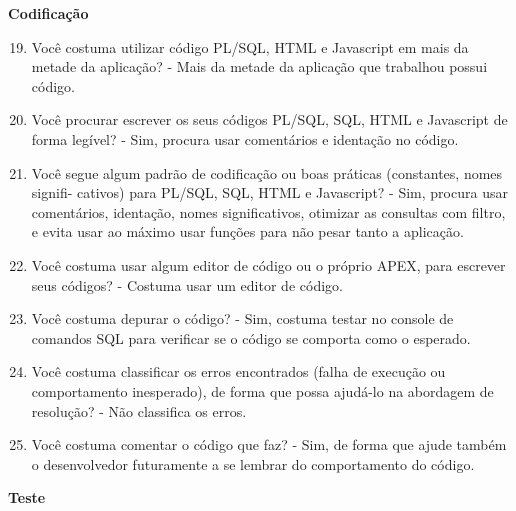 \begin{apendicesenv}
\textbf{Codificação}

\begin{enumerate}
	\setcounter{enumi}{18}
	\item Você costuma utilizar código PL/SQL, HTML e Javascript em mais da metade da
	aplicação?\newline
	- Mais da metade da aplicação que trabalhou possui código.
	\item Você procurar escrever os seus códigos PL/SQL, SQL, HTML e Javascript de forma
	legível?\newline
	- Sim, procura usar comentários e identação no código.
	\item Você segue algum padrão de codificação ou boas práticas (constantes, nomes signifi-
	cativos) para PL/SQL, SQL, HTML e Javascript?\newline
	- Sim, procura usar comentários, identação, nomes significativos, otimizar as consultas com filtro, e evita usar ao máximo usar funções para não pesar tanto a aplicação.
	\item Você costuma usar algum editor de código ou o próprio APEX, para escrever seus
	códigos?\newline
	- Costuma usar um editor de código.
	\item Você costuma depurar o código?\newline
	- Sim, costuma testar no console de comandos SQL para verificar se o código se comporta como o esperado.
	\item Você costuma classificar os erros encontrados (falha de execução ou comportamento
	inesperado), de forma que possa ajudá-lo na abordagem de resolução?\newline
	- Não classifica os erros.
	\item Você costuma comentar o código que faz?\newline
	- Sim, de forma que ajude também o desenvolvedor futuramente a se lembrar do comportamento do código.
\end{enumerate}

\textbf{Teste}


\end{apendicesenv}
